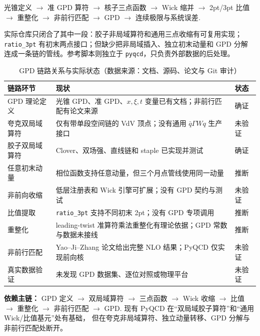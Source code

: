 \documentclass[UTF8]{ctexart}
\newcommand{\verified}{\textcolor{struct}{确证}}
\newcommand{\inferred}{\textcolor{relation}{推断}}
\newcommand{\unverified}{\textcolor{warn}{未验证}}
\begin{document}
\begin{center}
\small
\textcolor{relation}{光锥定义} $\to$ \textcolor{relation}{准 GPD 算符}
$\to$ \textcolor{relation}{核子三点函数} $\to$ \textcolor{relation}{Wick 缩并}
$\to$ \textcolor{relation}{2pt/3pt 比值} $\to$ \textcolor{relation}{重整化}
$\to$ \textcolor{relation}{非前行匹配} $\to$ \textcolor{relation}{GPD}
$\to$ \textcolor{relation}{连续极限与系统误差}.
\end{center}

实际仓库只闭合了其中一段：胶子非局域算符和通用三点收缩有可复用实现；
\texttt{ratio\_3pt} 有初末两点接口；但缺少把非局域插入、独立初末动量和 GPD 分解
连成一条链的管线。参考脚本则独立于 \texttt{pyqcd}，只负责外部数据的后处理。

\begin{table}[htbp]
\centering
\small
\begin{tabularx}{\textwidth}{lXl}
\toprule
\textcolor{relation}{链路环节} & \textcolor{relation}{现状} & 状态 \\
\midrule
GPD 理论定义 & 光锥 GPD、准 GPD、$x,\xi,t$ 变量已有文档；非前行匹配有论文来源 &
\verified \\
夸克双局域算符 & 仅有带单段空间链的 VdV 顶点；没有通用 $\bar q\Gamma Wq$ 生产接口 &
\unverified \\
胶子双局域算符 & Clover、双场强、直线链和 staple 已实现并测试 &
\verified \\
任意初末动量 & 相位函数支持任意动量，但三个月点管线使用同一动量 &
\inferred \\
非前向收缩 & 低层注册表和 Wick 引擎可扩展；没有 GPD 契约与测试 &
\unverified \\
比值提取 & \texttt{ratio\_3pt} 支持不同初末 2pt；没有 GPD 专项调用 &
\inferred \\
重整化 & leading-twist 准算符乘法重整化有理论依据；GPD 常数与数据未接线 &
\inferred \\
非前行匹配 & Yao--Ji--Zhang 论文给出完整 NLO 结果；PyQCD 仅实现前向核 &
\unverified \\
真实数据验证 & 未发现 GPD 数据集、逐位对照或物理平台 &
\unverified \\
\bottomrule
\end{tabularx}
\caption{GPD 链路关系与实际状态（数据来源：文档、源码、论文与 Git 审计）}
\end{table}

\begin{keybox}
\textbf{依赖主链：}
\textcolor{relation}{GPD 定义 $\to$ 双局域算符 $\to$ 三点函数 $\to$ Wick 收缩
$\to$ 比值 $\to$ 重整化 $\to$ 非前行匹配 $\to$ GPD}.
现有 PyQCD 在“双局域胶子算符”和“通用 Wick/比值基元”处有基础，
但在夸克非局域算符、独立动量转移、GPD 分解与非前行匹配处断开。
\end{keybox}
\end{document}
